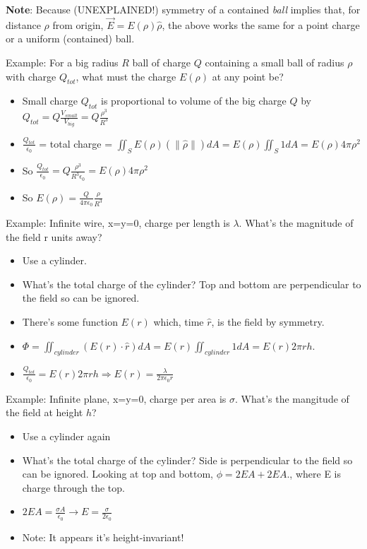 \documentclass[11pt, oneside]{article}   	%
\begin{document}
\textbf{Note}: Because (UNEXPLAINED!) symmetry of a contained \emph{ball} implies that, for distance $\rho$ from origin, $\vec{E} = E(\rho)\hat{\rho}$, the above works the same for a point charge or a uniform (contained) ball.

Example: For a big radius $R$ ball of charge $Q$ containing a small ball of radius $\rho$ with charge $Q_{tot}$, what must the charge $E(\rho)$ at any point be?

\begin{itemize}
\item Small charge $Q_{tot}$ is proportional to volume of the big charge $Q$ by $Q_{tot} = Q \frac{V_{small}}{V_{big}} = Q\frac{\rho^3}{R^3}$
\item $\frac{Q_{tot} }{\epsilon_0}$ = total charge = $\iint_S E(\rho)(\|\hat{\rho}\|)dA = E(\rho) \iint_S 1 dA  = E(\rho) 4 \pi \rho^2$
\item So $\frac{Q_{tot} }{\epsilon_0} = Q\frac{\rho^3}{R^3 {\epsilon_0}}  = E(\rho) 4 \pi \rho^2$
\item So $E(\rho) = \frac{Q}{4 \pi \epsilon_0} \frac{\rho}{R^3}$
\end{itemize}

Example: Infinite wire, x=y=0, charge per length is $\lambda$.  What's the magnitude of the field r units away?
\begin{itemize}
\item Use a cylinder.
\item What's the total charge of the cylinder?  Top and bottom are perpendicular to the field so can be ignored.
\item There's some function $E(r)$ which, time $\hat{r}$, is the field by symmetry.
\item $\Phi = \iint_{cylinder} (E(r) \cdot \hat{r})dA = E(r)  \iint_{cylinder} 1 dA  = E(r) 2 \pi r h$.
\item $\frac{Q_{tot}}{\epsilon_0} =  E(r) 2 \pi r h \Rightarrow E(r) = \frac{\lambda}{2\pi\epsilon_0 r}$
\end{itemize}


Example: Infinite plane, x=y=0, charge per area is $\sigma$.  What's the mangitude of the field at height $h$?
\begin{itemize}
\item  Use a cylinder again
\item What's the total charge of the cylinder?  Side is perpendicular to the field so can be ignored.  Looking at top and bottom, $\phi = 2EA + 2EA.$, where E is charge through the top.
\item $2EA = \frac{\sigma A}{\epsilon_0} \rightarrow E = \frac{\sigma}{2 \epsilon_0}$
\item Note: It appears it's height-invariant!
\end{itemize}
\end{document}
